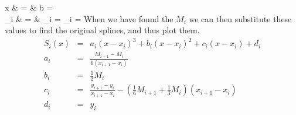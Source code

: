 x & = &
 \qquad
b =
 \\
\alpha_{i} & = & 
\qquad
\beta_{i} = 
\qquad
\gamma_{i} = 
\eeqn
When we have found the $M_i$ we can then substitute these values to find the original splines, and thus plot them.
\begin{eqnarray}
S_i(x)&=&a_i(x-x_i)^3+b_i(x-x_i)^2+c_i(x-x_i)+d_i\\
a_i &=& \frac{M_{i+1}-M_i}{6(x_{i+1}-x_i)}\\
b_i &=& \frac{1}{2}M_i\\
c_i &=& \frac{y_{i+1}-y_i}{x_{i+1}-x_i}-\left(\frac{1}{6}M_{i+1}+\frac{1}{3}M_i\right)(x_{i+1}-x_i)\\
d_i &=& y_i
\end{eqnarray}

